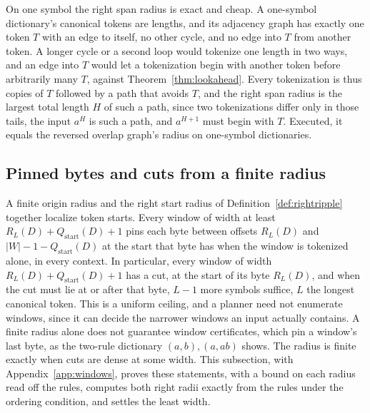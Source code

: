 \documentclass[11pt,a4paper]{article}
\theoremstyle{definition}
\theoremstyle{plain}
\newcommand{\ripple}{R_{L}}
\begin{document}

On one symbol the right span radius is exact and cheap. A one-symbol dictionary's canonical tokens are lengths, and its
adjacency graph has exactly one token \(T\) with an edge to itself, no other cycle, and no edge into \(T\) from another
token. A longer cycle or a second loop would tokenize one length in two ways, and an edge into \(T\) would let a
tokenization begin with another token before arbitrarily many \(T\), against Theorem~\ref{thm:lookahead}. Every
tokenization is thus copies of \(T\) followed by a path that avoids \(T\), and the right span radius is the largest
total length \(H\) of such a path, since two tokenizations differ only in those tails, the input \(a^H\) is such a path,
and \(a^{H+1}\) must begin with \(T\). Executed, it equals the reversed overlap graph's radius on \UnaryRightTables{}
one-symbol dictionaries.

\subsection{Pinned bytes and cuts from a finite radius}\label{sec:density}

A finite origin radius and the right start radius of Definition~\ref{def:rightripple} together localize token starts.
Every window of width at least \(\ripple(D) + Q_{\mathrm{start}}(D) + 1\) pins each byte between offsets \(\ripple(D)\)
and \(|W| - 1 - Q_{\mathrm{start}}(D)\) at the start that byte has when the window is tokenized alone, in every context.
In particular, every window of width \(\ripple(D) + Q_{\mathrm{start}}(D) + 1\) has a cut, at the start of its byte
\(\ripple(D)\), and when the cut must lie at or after that byte, \(L - 1\) more symbols suffice, \(L\) the longest
canonical token. This is a uniform ceiling, and a planner need not enumerate windows, since it can decide the narrower
windows an input actually contains. A finite radius alone does not guarantee window certificates, which pin a window's
last byte, as the two-rule dictionary \((a, b), (a, ab)\) shows. The radius is finite exactly when cuts are dense at
some width. This subsection, with Appendix~\ref{app:windows}, proves these statements, with a bound on each radius read
off the rules, computes both right radii exactly from the rules under the ordering condition, and settles the least
width.
\end{document}
